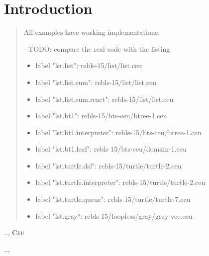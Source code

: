 \documentclass{acm_proc_article-sp}
\newcommand{\CEU}{\textsc{C\'{e}u}\xspace}
\begin{document}



\section{Introduction}

\begin{quotation}
All examples have working implementations:

- TODO: compare the real code with the listing

\begin{itemize}
\item label "lst.list":               rebls-15/list/list.ceu
\item label "lst.list.sum":           rebls-15/list/list.ceu
\item label "lst.list.sum.react":     rebls-15/list/list.ceu
%
\item label "lst.bt1":                rebls-15/bts-ceu/btree-1.ceu
\item label "lst.bt1.interpreter":    rebls-15/bts-ceu/btree-1.ceu
\item label "lst.bt1.leaf":           rebls-15/bts-ceu/domain-1.ceu
%
\item label "lst.turtle.dsl":         rebls-15/turtle/turtle-2.ceu
\item label "lst.turtle.interpreter": rebls-15/turtle/turtle-2.ceu
\item label "lst.turtle.queue":       rebls-15/turtle/turtle-7.ceu
%
\item label "lst.gray":               rebls-15/loopless/gray/gray-vec.ceu
\end{itemize}
\end{quotation}

\begin{comment}
Difficult because of
    multiple stack frames
    concurrent stack frames
    persistent stack frames (across reactions, with other parts executing)
    static memory management
    mutation of the data structure being traversed
\end{comment}

... \CEU~\cite{ceu.sensys13,ceu.mod15}

...
\end{document}
